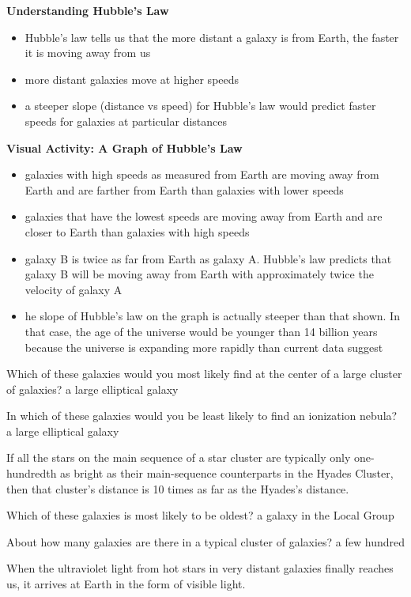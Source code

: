\textbf{Understanding Hubble’s Law}
\begin{itemize}
    \item Hubble’s law tells us that the more distant a galaxy is from Earth, the faster it is moving away from us
    \item more distant galaxies move at higher speeds
    \item a steeper slope (distance vs speed) for Hubble’s law would predict faster speeds for galaxies at particular distances
\end{itemize}
\textbf{Visual Activity: A Graph of Hubble’s Law}
\begin{itemize}
    \item galaxies with high speeds as measured from Earth are moving away from Earth and are farther from Earth than galaxies with lower speeds
    \item galaxies that have the lowest speeds are moving away from Earth and are closer to Earth than galaxies with high speeds
    \item galaxy B is twice as far from Earth as galaxy A. Hubble’s law predicts that galaxy B will be moving away from Earth with approximately twice the velocity of galaxy A
    \item he slope of Hubble’s law on the graph is actually steeper than that shown. In that case, the age of the universe would be younger than 14 billion years because the universe is expanding more rapidly than current data suggest
\end{itemize}

Which of these galaxies would you most likely find at the center of a large cluster of galaxies? a large elliptical galaxy

In which of these galaxies would you be least likely to find an ionization nebula? a large elliptical galaxy

If all the stars on the main sequence of a star cluster are typically only one-hundredth as bright as their main-sequence counterparts in the Hyades Cluster, then that cluster's distance is 10 times as far as the Hyades's distance.

Which of these galaxies is most likely to be oldest? a galaxy in the Local Group

About how many galaxies are there in a typical cluster of galaxies?  a few hundred

When the ultraviolet light from hot stars in very distant galaxies finally reaches us, it arrives at Earth in the form of visible light.

